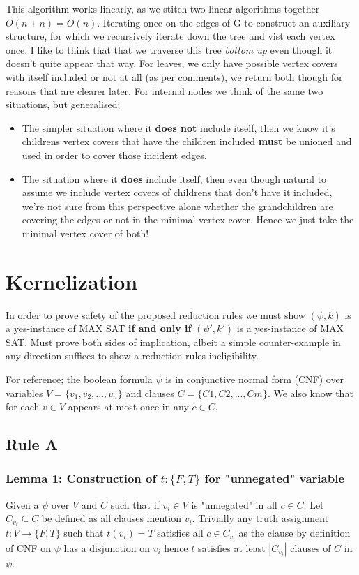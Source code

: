 \documentclass{article}
\begin{document}
This algorithm works linearly, as we stitch two linear algorithms together $O(n + n)=O(n)$. Iterating once on the edges of G to construct an auxiliary structure, for which we recursively iterate down the tree and vist each vertex once. I like to think that that we traverse this tree {\em bottom up} even though it doesn't quite appear that way. For leaves, we only have possible vertex covers with itself included or not at all (as per comments), we return both though for reasons that are clearer later. For internal nodes we think of the same two situations, but generalised;

\begin{itemize}
  \item The simpler situation where it {\bf does not} include itself, then we know it's childrens vertex covers that have the children included {\bf must} be unioned and used in order to cover those incident edges.
  \item The situation where it {\bf does} include itself, then even though natural to assume we include vertex covers of childrens that don't have it included, we're not sure from this perspective alone whether the grandchildren are covering the edges or not in the minimal vertex cover. Hence we just take the minimal vertex cover of both!
\end{itemize}

\section*{Kernelization}
In order to prove safety of the proposed reduction rules we must show $(\psi, k)$ is a yes-instance of MAX SAT {\bf if and only if} $(\psi', k')$ is a yes-instance of MAX SAT. Must prove both sides of implication, albeit a simple counter-example in any direction suffices to show a reduction rules ineligibility.

For reference; the boolean formula $\psi$ is in conjunctive normal form (CNF) over variables $V = \{v_1, v_2, ... , v_n\}$ and clauses $C = \{C1, C2, ... , Cm\}$. We also know that for each $v \in V$ appears at most once in any $c \in C$.

\subsection*{Rule A}
\subsubsection*{Lemma 1: Construction of $t: \{F,T\}$ for "unnegated" variable}
Given a $\psi$ over $V$ and $C$ such that if $v_i \in V$ is "unnegated" in all $c \in C$. Let $C_{v_i} \subseteq C$ be defined as all clauses mention $v_i$. Trivially any truth assignment $t: V \rightarrow \{F,T\}$ such that $t(v_i) = T$ satisfies all $c \in C_{v_i}$ as the clause by definition of CNF on $\psi$ has a disjunction on $v_i$ hence $t$ satisfies at least $|C_{v_i}|$ clauses of $C$ in $\psi$.
\end{document}
